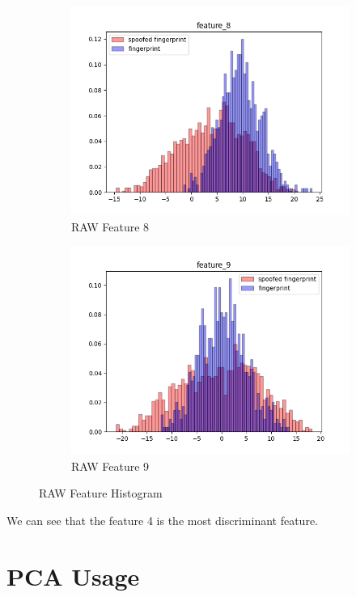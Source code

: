 \documentclass[english]{report}
\begin{document}
\begin{figure}[h!]
\begin{subfigure}{0.3\textwidth}
        \includegraphics[scale=0.3]{../../images/feature_plot/hist_feature_8}
        \caption{RAW Feature 8}
    \end{subfigure}
    \begin{subfigure}{0.3\textwidth}
        \includegraphics[scale=0.3]{../../images/feature_plot/hist_feature_9}
        \caption{RAW Feature 9}
    \end{subfigure}
    \centering
    \caption{RAW Feature Histogram}
    \label{fig:RawFeatureHistogram}
\end{figure}

We can see that the feature 4 is the most discriminant feature.


\section{PCA Usage}
\end{document}

